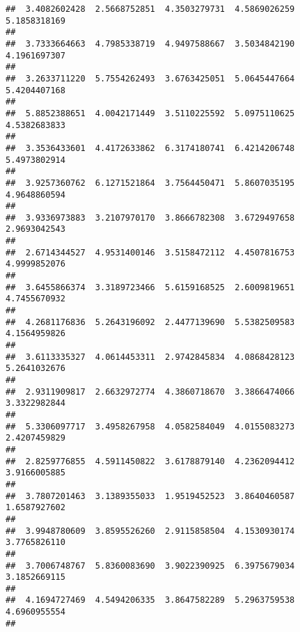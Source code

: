 \documentclass[]{article}
\begin{document}
\begin{verbatim}
##  3.4082602428  2.5668752851  4.3503279731  4.5869026259  5.1858318169 
##                                                                       
##  3.7333664663  4.7985338719  4.9497588667  3.5034842190  4.1961697307 
##                                                                       
##  3.2633711220  5.7554262493  3.6763425051  5.0645447664  5.4204407168 
##                                                                       
##  5.8852388651  4.0042171449  3.5110225592  5.0975110625  4.5382683833 
##                                                                       
##  3.3536433601  4.4172633862  6.3174180741  6.4214206748  5.4973802914 
##                                                                       
##  3.9257360762  6.1271521864  3.7564450471  5.8607035195  4.9648860594 
##                                                                       
##  3.9336973883  3.2107970170  3.8666782308  3.6729497658  2.9693042543 
##                                                                       
##  2.6714344527  4.9531400146  3.5158472112  4.4507816753  4.9999852076 
##                                                                       
##  3.6455866374  3.3189723466  5.6159168525  2.6009819651  4.7455670932 
##                                                                       
##  4.2681176836  5.2643196092  2.4477139690  5.5382509583  4.1564959826 
##                                                                       
##  3.6113335327  4.0614453311  2.9742845834  4.0868428123  5.2641032676 
##                                                                       
##  2.9311909817  2.6632972774  4.3860718670  3.3866474066  3.3322982844 
##                                                                       
##  5.3306097717  3.4958267958  4.0582584049  4.0155083273  2.4207459829 
##                                                                       
##  2.8259776855  4.5911450822  3.6178879140  4.2362094412  3.9166005885 
##                                                                       
##  3.7807201463  3.1389355033  1.9519452523  3.8640460587  1.6587927602 
##                                                                       
##  3.9948780609  3.8595526260  2.9115858504  4.1530930174  3.7765826110 
##                                                                       
##  3.7006748767  5.8360083690  3.9022390925  6.3975679034  3.1852669115 
##                                                                       
##  4.1694727469  4.5494206335  3.8647582289  5.2963759538  4.6960955554 
##                                                                       

\end{verbatim}
\end{document}
